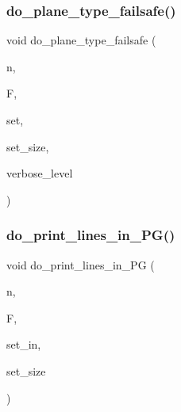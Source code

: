 \mbox{\label{geometric__operations_8_c_a794cf923c790d164c5ac454a2ea3ce66}} 
\subsubsection{\texorpdfstring{do\+\_\+plane\+\_\+type\+\_\+failsafe()}{do\_plane\_type\_failsafe()}}
{\footnotesize\ttfamily void do\+\_\+plane\+\_\+type\+\_\+failsafe (\begin{DoxyParamCaption}\item[{\mbox{\hyperlink{galois_8h_a09fddde158a3a20bd2dcadb609de11dc}{I\+NT}}}]{n,  }\item[{\mbox{\hyperlink{classfinite__field}{finite\+\_\+field}} $\ast$}]{F,  }\item[{\mbox{\hyperlink{galois_8h_a09fddde158a3a20bd2dcadb609de11dc}{I\+NT}} $\ast$}]{set,  }\item[{\mbox{\hyperlink{galois_8h_a09fddde158a3a20bd2dcadb609de11dc}{I\+NT}}}]{set\+\_\+size,  }\item[{\mbox{\hyperlink{galois_8h_a09fddde158a3a20bd2dcadb609de11dc}{I\+NT}}}]{verbose\+\_\+level }\end{DoxyParamCaption})}

\mbox{\label{geometric__operations_8_c_a5abe354dacebaac936368223433c51c4}} 
\subsubsection{\texorpdfstring{do\+\_\+print\+\_\+lines\+\_\+in\+\_\+\+P\+G()}{do\_print\_lines\_in\_PG()}}
{\footnotesize\ttfamily void do\+\_\+print\+\_\+lines\+\_\+in\+\_\+\+PG (\begin{DoxyParamCaption}\item[{\mbox{\hyperlink{galois_8h_a09fddde158a3a20bd2dcadb609de11dc}{I\+NT}}}]{n,  }\item[{\mbox{\hyperlink{classfinite__field}{finite\+\_\+field}} $\ast$}]{F,  }\item[{\mbox{\hyperlink{galois_8h_a09fddde158a3a20bd2dcadb609de11dc}{I\+NT}} $\ast$}]{set\+\_\+in,  }\item[{\mbox{\hyperlink{galois_8h_a09fddde158a3a20bd2dcadb609de11dc}{I\+NT}}}]{set\+\_\+size }\end{DoxyParamCaption})}

